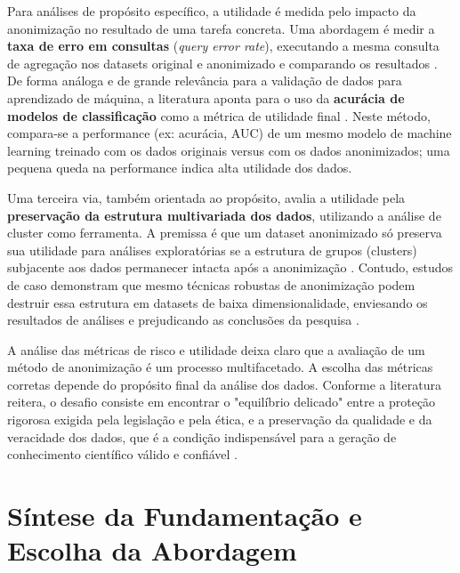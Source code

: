 Para análises de propósito específico, a utilidade é medida pelo impacto da anonimização no resultado de uma tarefa concreta. Uma abordagem é medir a \textbf{taxa de erro em consultas} (\textit{query error rate}), executando a mesma consulta de agregação nos datasets original e anonimizado e comparando os resultados \cite{Lee2017}. De forma análoga e de grande relevância para a validação de dados para aprendizado de máquina, a literatura aponta para o uso da \textbf{acurácia de modelos de classificação} como a métrica de utilidade final \cite{Olatunji2024}. Neste método, compara-se a performance (ex: acurácia, AUC) de um mesmo modelo de machine learning treinado com os dados originais versus com os dados anonimizados; uma pequena queda na performance indica alta utilidade dos dados.

Uma terceira via, também orientada ao propósito, avalia a utilidade pela \textbf{preservação da estrutura multivariada dos dados}, utilizando a análise de cluster como ferramenta. A premissa é que um dataset anonimizado só preserva sua utilidade para análises exploratórias se a estrutura de grupos (clusters) subjacente aos dados permanecer intacta após a anonimização \cite{Ferrao2022}. Contudo, estudos de caso demonstram que mesmo técnicas robustas de anonimização podem destruir essa estrutura em datasets de baixa dimensionalidade, enviesando os resultados de análises e prejudicando as conclusões da pesquisa \cite{Ferrao2022}.

A análise das métricas de risco e utilidade deixa claro que a avaliação de um método de anonimização é um processo multifacetado. A escolha das métricas corretas depende do propósito final da análise dos dados. Conforme a literatura reitera, o desafio consiste em encontrar o "equilíbrio delicado" entre a proteção rigorosa exigida pela legislação e pela ética, e a preservação da qualidade e da veracidade dos dados, que é a condição indispensável para a geração de conhecimento científico válido e confiável \cite{Vovk2023, Ferrao2022}.

\section{Síntese da Fundamentação e Escolha da Abordagem}
\label{sec:fund-sintese}
